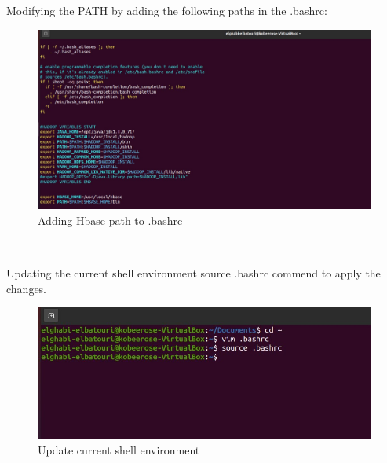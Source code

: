 \begin{spacing}{1.2}
\par Modifying the PATH by adding the following paths in the .bashrc:
\\
\begin{figure}[!htb] 
\begin{center} 
\includegraphics[width=1\linewidth]{Pictures/HBase/Configuring Hbase in Standalone & Pseudo-distributed mode/Installing and Configuring Apache Hbase/Adding Hbase path to .bashrc} 
\end{center} 
\caption{Adding Hbase path to .bashrc} 
\end{figure}  \FloatBarrier
\\

\par Updating the current shell environment source .bashrc commend to apply the changes.
\\
\begin{figure}[!htb] 
\begin{center} 
\includegraphics[width=1\linewidth]{Pictures/HBase/Configuring Hbase in Standalone & Pseudo-distributed mode/Installing and Configuring Apache Hbase/Update current shell environment} 
\end{center} 
\caption{Update current shell environment} 
\end{figure}  \FloatBarrier
\\


\end{spacing}

